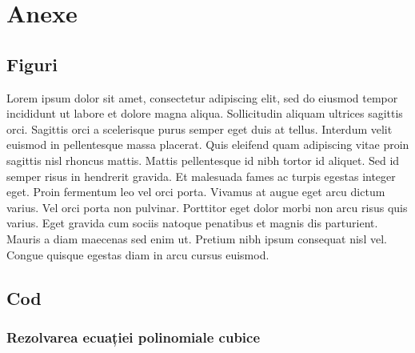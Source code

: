 \appendix

\chapter{Anexe}

\section{Figuri}

Lorem ipsum dolor sit amet, consectetur adipiscing elit, sed do eiusmod tempor incididunt ut labore et dolore magna aliqua. Sollicitudin aliquam ultrices sagittis orci. Sagittis orci a scelerisque purus semper eget duis at tellus. Interdum velit euismod in pellentesque massa placerat. Quis eleifend quam adipiscing vitae proin sagittis nisl rhoncus mattis. Mattis pellentesque id nibh tortor id aliquet. Sed id semper risus in hendrerit gravida. Et malesuada fames ac turpis egestas integer eget. Proin fermentum leo vel orci porta. Vivamus at augue eget arcu dictum varius. Vel orci porta non pulvinar. Porttitor eget dolor morbi non arcu risus quis varius. Eget gravida cum sociis natoque penatibus et magnis dis parturient. Mauris a diam maecenas sed enim ut. Pretium nibh ipsum consequat nisl vel. Congue quisque egestas diam in arcu cursus euismod.

\clearpage


\section{Cod}

\subsection{Rezolvarea ecuației polinomiale cubice}



\clearpage